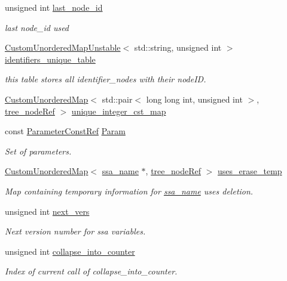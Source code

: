 \begin{DoxyCompactItemize}
unsigned int \hyperlink{classtree__manager_a1c8e32360835503fb5089a3b49739a7d}{last\+\_\+node\+\_\+id}
\begin{DoxyCompactList}\small\item\em last node\+\_\+id used \end{DoxyCompactList}\item 
\hyperlink{custom__map_8hpp_a8cbaceffc09790a885ec7e9c17809c69}{Custom\+Unordered\+Map\+Unstable}$<$ std\+::string, unsigned int $>$ \hyperlink{classtree__manager_a44fd592db00c4a45e1c8d6fdd7a0a7b4}{identifiers\+\_\+unique\+\_\+table}
\begin{DoxyCompactList}\small\item\em this table stores all identifier\+\_\+nodes with their node\+ID. \end{DoxyCompactList}\item 
\hyperlink{custom__map_8hpp_ad1ed68f2ff093683ab1a33522b144adc}{Custom\+Unordered\+Map}$<$ std\+::pair$<$ long long int, unsigned int $>$, \hyperlink{tree__node_8hpp_a6ee377554d1c4871ad66a337eaa67fd5}{tree\+\_\+node\+Ref} $>$ \hyperlink{classtree__manager_a663dfe307bce8efbccb7ad2a7f52023d}{unique\+\_\+integer\+\_\+cst\+\_\+map}
\item 
const \hyperlink{Parameter_8hpp_a37841774a6fcb479b597fdf8955eb4ea}{Parameter\+Const\+Ref} \hyperlink{classtree__manager_a34d676e5357b95584d95d20e229e6c0e}{Param}
\begin{DoxyCompactList}\small\item\em Set of parameters. \end{DoxyCompactList}\item 
\hyperlink{custom__map_8hpp_ad1ed68f2ff093683ab1a33522b144adc}{Custom\+Unordered\+Map}$<$ \hyperlink{structssa__name}{ssa\+\_\+name} $\ast$, \hyperlink{tree__node_8hpp_a6ee377554d1c4871ad66a337eaa67fd5}{tree\+\_\+node\+Ref} $>$ \hyperlink{classtree__manager_ab8e16b8e13c1b7d6f4bdc54d089e5ed1}{uses\+\_\+erase\+\_\+temp}
\begin{DoxyCompactList}\small\item\em Map containing temporary information for \hyperlink{structssa__name}{ssa\+\_\+name} uses deletion. \end{DoxyCompactList}\item 
unsigned int \hyperlink{classtree__manager_a3cfd3a47f057c1211ef07ef2bc5a755b}{next\+\_\+vers}
\begin{DoxyCompactList}\small\item\em Next version number for ssa variables. \end{DoxyCompactList}\item 
unsigned int \hyperlink{classtree__manager_a1c07ed7614093eadef6f97dae7197035}{collapse\+\_\+into\+\_\+counter}
\begin{DoxyCompactList}\small\item\em Index of current call of collapse\+\_\+into\+\_\+counter. \end{DoxyCompactList}\end{DoxyCompactItemize}
